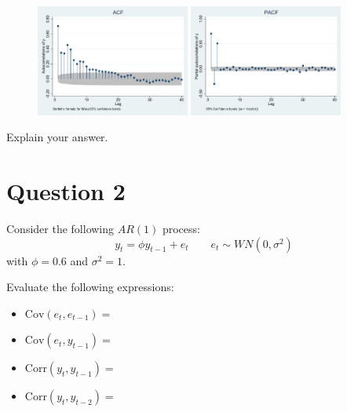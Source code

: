 \documentclass[12pt]{article}
\begin{document}
\begin{figure}[H]
    \centering
    \includegraphics[width=0.45\textwidth]{./stata/fig/acf.pdf}
    \includegraphics[width=0.45\textwidth]{./stata/fig/pacf.pdf}
\end{figure}

Explain your answer.

\vspace{5cm}

\section*{Question 2 }

Consider the following $ AR(1) $ process:
\begin{equation*}
    y_{t} = \phi y_{t-1} + e_{t} \qquad e_{t} \sim WN(0, \sigma^{2})
\end{equation*}
with $ \phi = 0.6 $ and $ \sigma^{2} = 1 $.

Evaluate the following expressions:
\begin{itemize}
    \item $ \mathrm{Cov} \left( e_{t}, e_{t-1} \right) = $
          \vspace{2cm}
    \item $ \mathrm{Cov} \left( e_{t}, y_{t-1} \right) = $
          \vspace{2cm}
    \item $ \mathrm{Corr} \left( y_{t}, y_{t-1} \right) = $
          \vspace{2cm}
    \item $ \mathrm{Corr} \left( y_{t}, y_{t-2} \right) = $
          \vspace{2cm}
\end{itemize}
\end{document}

